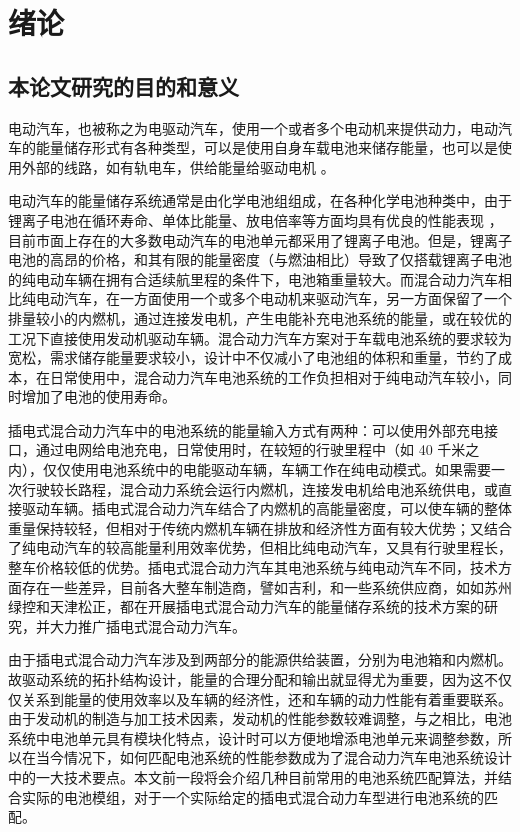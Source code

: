 \chapter{绪论}
\label{chap:intro}
\section{本论文研究的目的和意义}

电动汽车，也被称之为电驱动汽车，使用一个或者多个电动机来提供动力，电动汽车的能量储存形式有各种类型，可以是使用自身车载电池来储存能量，也可以是使用外部的线路，如有轨电车，供给能量给驱动电机 \cite{phev-zongshu}。

电动汽车的能量储存系统通常是由化学电池组组成，在各种化学电池种类中，由于锂离子电池在循环寿命、单体比能量、放电倍率等方面均具有优良的性能表现 \cite{nengliangchucun}，目前市面上存在的大多数电动汽车的电池单元都采用了锂离子电池。但是，锂离子电池的高昂的价格，和其有限的能量密度（与燃油相比）导致了仅搭载锂离子电池的纯电动车辆在拥有合适续航里程的条件下，电池箱重量较大。而混合动力汽车相比纯电动汽车，在一方面使用一个或多个电动机来驱动汽车，另一方面保留了一个排量较小的内燃机，通过连接发电机，产生电能补充电池系统的能量，或在较优的工况下直接使用发动机驱动车辆。混合动力汽车方案对于车载电池系统的要求较为宽松，需求储存能量要求较小，设计中不仅减小了电池组的体积和重量，节约了成本，在日常使用中，混合动力汽车电池系统的工作负担相对于纯电动汽车较小，同时增加了电池的使用寿命。

插电式混合动力汽车中的电池系统的能量输入方式有两种：可以使用外部充电接口，通过电网给电池充电，日常使用时，在较短的行驶里程中（如 40 千米之内），仅仅使用电池系统中的电能驱动车辆，车辆工作在纯电动模式。如果需要一次行驶较长路程，混合动力系统会运行内燃机，连接发电机给电池系统供电，或直接驱动车辆。插电式混合动力汽车结合了内燃机的高能量密度，可以使车辆的整体重量保持较轻，但相对于传统内燃机车辆在排放和经济性方面有较大优势；又结合了纯电动汽车的较高能量利用效率优势，但相比纯电动汽车，又具有行驶里程长，整车价格较低的优势。插电式混合动力汽车其电池系统与纯电动汽车不同，技术方面存在一些差异，目前各大整车制造商，譬如吉利，和一些系统供应商，如如苏州绿控和天津松正，都在开展插电式混合动力汽车的能量储存系统的技术方案的研究，并大力推广插电式混合动力汽车。

由于插电式混合动力汽车涉及到两部分的能源供给装置，分别为电池箱和内燃机。故驱动系统的拓扑结构设计，能量的合理分配和输出就显得尤为重要，因为这不仅仅关系到能量的使用效率以及车辆的经济性，还和车辆的动力性能有着重要联系。由于发动机的制造与加工技术因素，发动机的性能参数较难调整，与之相比，电池系统中电池单元具有模块化特点，设计时可以方便地增添电池单元来调整参数，所以在当今情况下，如何匹配电池系统的性能参数成为了混合动力汽车电池系统设计中的一大技术要点。本文前一段将会介绍几种目前常用的电池系统匹配算法，并结合实际的电池模组，对于一个实际给定的插电式混合动力车型进行电池系统的匹配。

